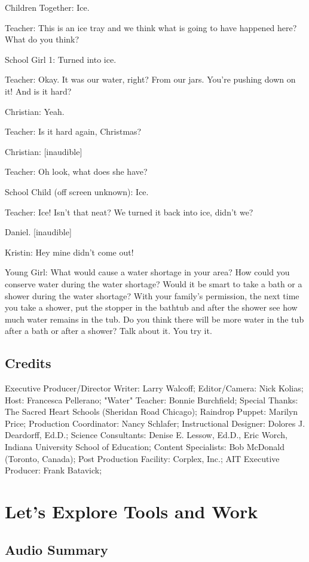 Children Together: Ice.

Teacher: This is an ice tray and we think what is going to have happened here? What do you think?

School Girl 1: Turned into ice.

Teacher: Okay. It was our water, right? From our jars. You're pushing down on it! And is it hard?

Christian: Yeah.

Teacher: Is it hard again, Christmas?

Christian: [inaudible]

Teacher: Oh look, what does she have?

School Child (off screen unknown): Ice.

Teacher: Ice! Isn't that neat? We turned it back into ice, didn't we?

Daniel. [inaudible]

Kristin: Hey mine didn't come out!

Young Girl: What would cause a water shortage in your area? How could you conserve water during the water shortage? Would it be smart to take a bath or a shower during the water shortage? With your family's permission, the next time you take a shower, put the stopper in the bathtub and after the shower see how much water remains in the tub. Do you think there will be more water in the tub after a bath or after a shower? Talk about it. You try it.

\subsection{Credits}

Executive Producer/Director Writer: Larry Walcoff;
Editor/Camera: Nick Kolias;
Host: Francesca Pellerano;
"Water" Teacher: Bonnie Burchfield;
Special Thanks: The Sacred Heart Schools (Sheridan Road Chicago);
Raindrop Puppet: Marilyn Price;
Production Coordinator: Nancy Schlafer;
Instructional Designer: Dolores J. Deardorff, Ed.D.;
Science Consultants: Denise E. Lessow, Ed.D., Eric Worch, Indiana University School of Education;
Content Specialists: Bob McDonald (Toronto, Canada);
Post Production Facility: Corplex, Inc.;
AIT Executive Producer: Frank Batavick;

\section{Let's Explore Tools and Work}

\subsection{Audio Summary}


